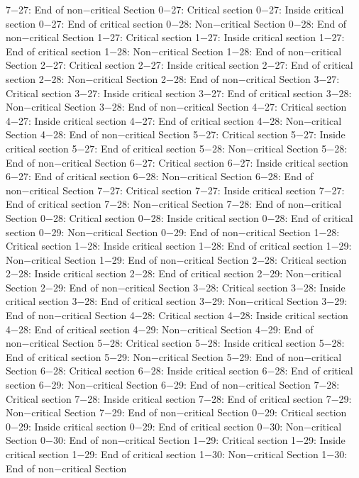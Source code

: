 7−27: End of non−critical Section
0−27: Critical section
0−27: Inside critical section
0−27: End of critical section
0−28: Non−critical Section
0−28: End of non−critical Section
1−27: Critical section
1−27: Inside critical section
1−27: End of critical section
1−28: Non−critical Section
1−28: End of non−critical Section
2−27: Critical section
2−27: Inside critical section
2−27: End of critical section
2−28: Non−critical Section
2−28: End of non−critical Section
3−27: Critical section
3−27: Inside critical section
3−27: End of critical section
3−28: Non−critical Section
3−28: End of non−critical Section
4−27: Critical section
4−27: Inside critical section
4−27: End of critical section
4−28: Non−critical Section
4−28: End of non−critical Section
5−27: Critical section
5−27: Inside critical section
5−27: End of critical section
5−28: Non−critical Section
5−28: End of non−critical Section
6−27: Critical section
6−27: Inside critical section
6−27: End of critical section
6−28: Non−critical Section
6−28: End of non−critical Section
7−27: Critical section
7−27: Inside critical section
7−27: End of critical section
7−28: Non−critical Section
7−28: End of non−critical Section
0−28: Critical section
0−28: Inside critical section
0−28: End of critical section
0−29: Non−critical Section
0−29: End of non−critical Section
1−28: Critical section
1−28: Inside critical section
1−28: End of critical section
1−29: Non−critical Section
1−29: End of non−critical Section
2−28: Critical section
2−28: Inside critical section
2−28: End of critical section
2−29: Non−critical Section
2−29: End of non−critical Section
3−28: Critical section
3−28: Inside critical section
3−28: End of critical section
3−29: Non−critical Section
3−29: End of non−critical Section
4−28: Critical section
4−28: Inside critical section
4−28: End of critical section
4−29: Non−critical Section
4−29: End of non−critical Section
5−28: Critical section
5−28: Inside critical section
5−28: End of critical section
5−29: Non−critical Section
5−29: End of non−critical Section
6−28: Critical section
6−28: Inside critical section
6−28: End of critical section
6−29: Non−critical Section
6−29: End of non−critical Section
7−28: Critical section
7−28: Inside critical section
7−28: End of critical section
7−29: Non−critical Section
7−29: End of non−critical Section
0−29: Critical section
0−29: Inside critical section
0−29: End of critical section
0−30: Non−critical Section
0−30: End of non−critical Section
1−29: Critical section
1−29: Inside critical section
1−29: End of critical section
1−30: Non−critical Section
1−30: End of non−critical Section
